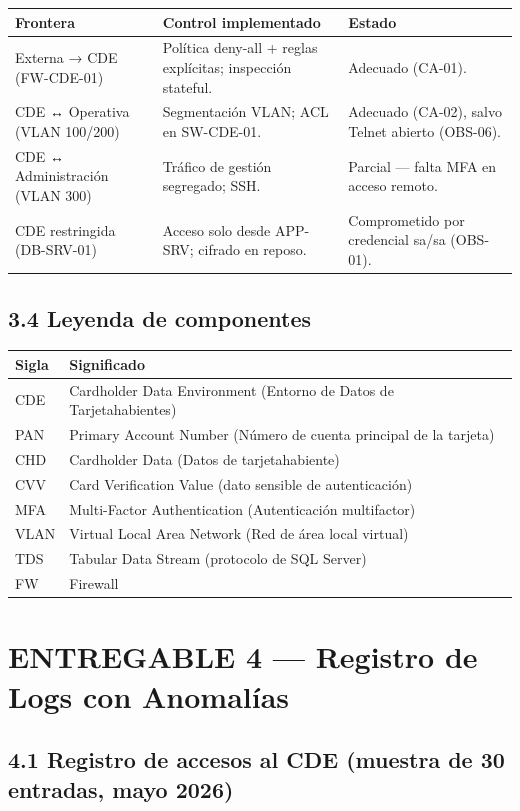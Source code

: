 \documentclass[11pt,a4paper]{article}
\begin{document}
\begin{tabularx}{\textwidth}{P{3cm}P{4cm}L}
\toprule
\textbf{Frontera} & \textbf{Control implementado} & \textbf{Estado} \\
\midrule
Externa → CDE (FW-CDE-01) & Política deny-all + reglas explícitas; inspección stateful. & Adecuado (CA-01). \\
CDE ↔ Operativa (VLAN 100/200) & Segmentación VLAN; ACL en SW-CDE-01. & Adecuado (CA-02), salvo Telnet abierto (OBS-06). \\
CDE ↔ Administración (VLAN 300) & Tráfico de gestión segregado; SSH. & Parcial — falta MFA en acceso remoto. \\
CDE restringida (DB-SRV-01) & Acceso solo desde APP-SRV; cifrado en reposo. & Comprometido por credencial sa/sa (OBS-01). \\
\bottomrule
\end{tabularx}

\subsection{3.4 Leyenda de componentes}

\begin{tabularx}{\textwidth}{P{5cm}L}
\toprule
\textbf{Sigla} & \textbf{Significado} \\
\midrule
CDE & Cardholder Data Environment (Entorno de Datos de Tarjetahabientes) \\
PAN & Primary Account Number (Número de cuenta principal de la tarjeta) \\
CHD & Cardholder Data (Datos de tarjetahabiente) \\
CVV & Card Verification Value (dato sensible de autenticación) \\
MFA & Multi-Factor Authentication (Autenticación multifactor) \\
VLAN & Virtual Local Area Network (Red de área local virtual) \\
TDS & Tabular Data Stream (protocolo de SQL Server) \\
FW & Firewall \\
\bottomrule
\end{tabularx}

\clearpage

\section{ENTREGABLE 4 — Registro de Logs con Anomalías}

\subsection{4.1 Registro de accesos al CDE (muestra de 30 entradas, mayo 2026)}
\end{document}
